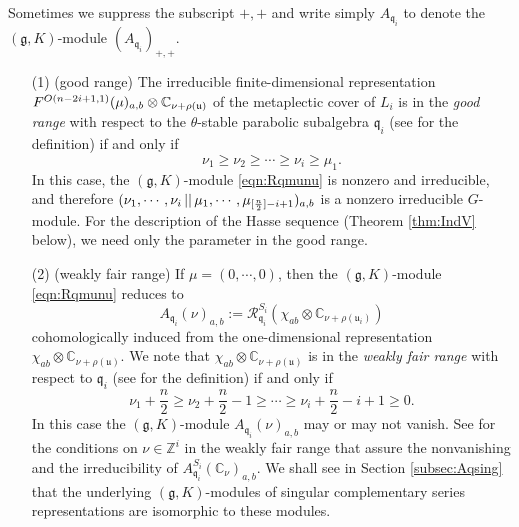 Sometimes we suppress the subscript $+,+$
 and write simply $A_{\mathfrak{q}_i}$
 to denote the $({\mathfrak{g}},K)$-module $(A_{\mathfrak{q}_i})_{+,+}$.  
\begin{remark}
\label{rem:goodrange}
\begin{enumerate}
\item[(1)]
(good range)\enspace
The irreducible finite-dimensional representation 
 $F^{{O(n-2i+1,1)}}({\mu})_{a, b} \otimes {\mathbb{C}}_{\nu+\rho({\mathfrak{u}})}$ 
 of the metaplectic cover of $L_i$ is 
 in the 
 {\it{good range}} 
 with respect to the $\theta$-stable parabolic subalgebra
 ${\mathfrak{q}_i}$
 (see \cite[Def.~0.49]{KV} for the definition)
 if and only if
\[ \nu_1 \ge \nu_2 \ge \cdots \ge \nu_i \ge \mu_1.\]
In this case, 
 the $({\mathfrak{g}},K)$-module \eqref{eqn:Rqmunu}
 is nonzero and irreducible,
 and therefore
 $({\nu_1, \cdots,\nu_i}\,||\,{\mu_1, \cdots, \mu_{[\frac n 2]-i+1}})_{a, b}$
 is a nonzero irreducible $G$-module.  
For the description
 of the Hasse sequence
 (Theorem \ref{thm:IndV} below), 
 we need only the parameter in the good range.  
\item[(2)]
(weakly fair range)\enspace
If $\mu=(0,\cdots,0)$, 
then the $({\mathfrak{g}},K)$-module \eqref{eqn:Rqmunu} reduces to
\[
  A_{\mathfrak{q}_i}(\nu)_{a, b}
   :={\mathcal{R}}_{\mathfrak{q}_i}^{S_i}
     (\chi_{ab}\otimes {\mathbb{C}}_{\nu+\rho({\mathfrak{u}}_i)})  
\]
cohomologically induced from the one-dimensional representation
 $\chi_{ab}\otimes {\mathbb{C}}_{\nu+\rho({\mathfrak{u}})}$.  
We note that $\chi_{ab}\otimes {\mathbb{C}}_{\nu+\rho({\mathfrak{u}})}$
 is in the 
{\it{weakly fair range}} 
 with respect to $\mathfrak{q}_i$
 (see \cite[Def.~0.52]{KV} for the definition)
 if and only if 
\begin{equation}
\label{eqn:wfair}
\nu_{1} + \frac{n}{2} 
\ge 
\nu_{2} + \frac{n}{2} -1
\ge 
\cdots
\ge
\nu_{i} + \frac{n}{2} -i+1
\ge 
0.  
\end{equation}
In this case the $({\mathfrak{g}}, K)$-module
 $A_{\mathfrak{q}_i}(\nu)_{a, b}$
 may or may not vanish.  
See \cite[Thm.~3]{KMemoirs92}
 for the conditions on $\nu \in {\mathbb{Z}}^i$
 in the weakly fair range
 that assure the nonvanishing 
 and the irreducibility
 of $A_{\mathfrak{q}_i}^{S_i}({\mathbb{C}}_{\nu})_{a, b}$.  
We shall see in Section \ref{subsec:Aqsing} 
 that the underlying $({\mathfrak{g}}, K)$-modules
 of singular complementary series representations
 are isomorphic to these modules.  
\end{enumerate}
\end{remark}


